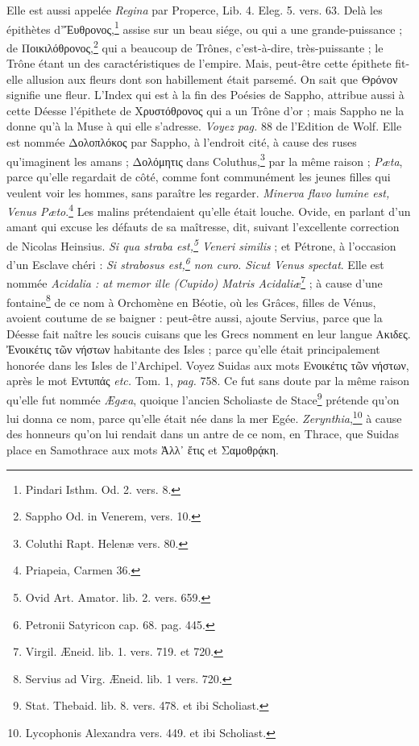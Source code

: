 \documentclass[a4paper, 11pt, oneside, polutonikogreek, french]{article}
\begin{document}
Elle est aussi appelée \emph{Regina} par Properce, Lib. 4. Eleg. 5. vers. 63. Delà les épithètes d'Ἔυθρονος,\footnote{Pindari Isthm. Od. 2. vers. 8.} assise sur un beau siége, ou qui a une grande-puissance ; de Ποικιλόθρονος,\footnote{Sappho Od. in Venerem, vers. 10.} qui a beaucoup de Trônes, c'est-à-dire, très-puissante ; le Trône étant un des caractéristiques de l'empire. Mais, peut-être cette épithete fit-elle allusion aux fleurs dont son habillement était parsemé. On sait que Θρόνον signifie une fleur. L'Index qui est à la fin des Poésies de Sappho, attribue aussi à cette Déesse l'épithete de Χρυστόθρονος qui a un Trône d'or ; mais Sappho ne la donne qu'à la Muse à qui elle s'adresse. \emph{Voyez pag.} 88 de l'Edition de Wolf. Elle est nommée Δολοπλόκος par Sappho, à l'endroit cité, à cause des ruses qu'imaginent les amans ; Δολόμητις dans Coluthus,\footnote{Coluthi Rapt. Helenæ vers. 80.} par la même raison ; \emph{Pæta}, parce qu'elle regardait de côté, comme font communément les jeunes filles qui veulent voir les hommes, sans paraître les regarder. \emph{Minerva flavo lumine est, Venus Pæto}.\footnote{Priapeia, Carmen 36.} Les malins prétendaient qu'elle était louche. Ovide, en parlant d'un amant qui excuse les défauts de sa maîtresse, dit, suivant l'excellente correction de Nicolas Heinsius. \emph{Si qua straba est,\footnote{Ovid Art. Amator. lib. 2. vers. 659.} Veneri similis} ; et Pétrone, à l'occasion d'un Esclave chéri : \emph{Si strabosus est,\footnote{Petronii Satyricon cap. 68. pag. 445.} non curo. Sicut Venus spectat}. Elle est nommée \emph{Acidalia : at memor ille (Cupido) Matris Acidaliæ}\footnote{Virgil. Æneid. lib. 1. vers. 719. et 720.} ; à cause d'une fontaine\footnote{Servius ad Virg. Æneid. lib. 1 vers. 720.} de ce nom à Orchomène en Béotie, où les Grâces, filles de Vénus, avoient coutume de se baigner : peut-être aussi, ajoute Servius, parce que la Déesse fait naître les soucis cuisans que les Grecs nomment en leur langue Ακιδες. Ἐνοικέτις τῶν νήστων habitante des Isles ; parce qu'elle était principalement honorée dans les Isles de l'Archipel. Voyez Suidas aux mots Ενοικέτις τῶν νήστων, après le mot Εντυπάς \emph{etc.} Tom. 1, \emph{pag.} 758. Ce fut sans doute par la même raison qu'elle fut nommée \emph{Ægæa}, quoique l'ancien Scholiaste de Stace\footnote{Stat. Thebaid. lib. 8. vers. 478. et ibi Scholiast.} prétende qu'on lui donna ce nom, parce qu'elle était née dans la mer Egée. \emph{Zerynthia},\footnote{Lycophonis Alexandra vers. 449. et ibi Scholiast.} à cause des honneurs qu'on lui rendait dans un antre de ce nom, en Thrace, que Suidas place en Samothrace aux mots Ἀλλ᾽ ἔτις et Σαμοθρᾴκη.
\end{document}
